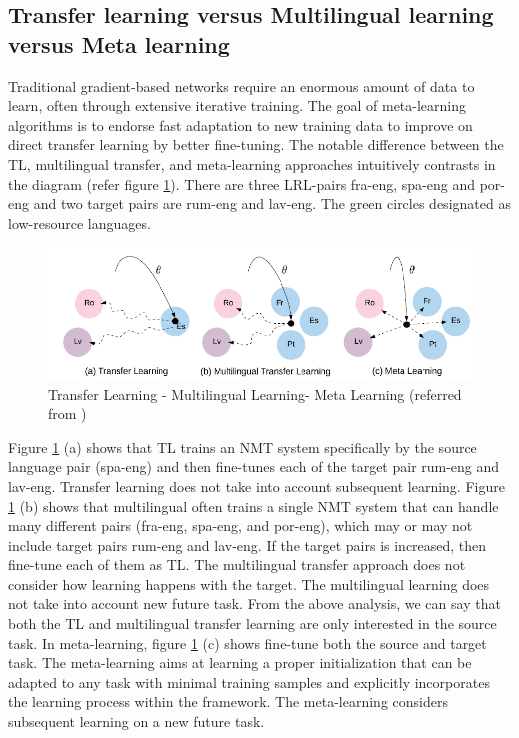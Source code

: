 \documentclass[manuscript,screen]{acmart}
\begin{document}
\subsection{Transfer learning versus Multilingual learning versus Meta learning}
Traditional gradient-based networks require an enormous amount of data to learn, often through extensive iterative training. The goal of meta-learning algorithms is to endorse fast adaptation to new training data to improve on direct transfer learning by better fine-tuning. The notable difference between the TL, multilingual transfer, and meta-learning approaches intuitively contrasts in the diagram (refer figure \ref{TL-MultiL-MetaL}). There are three LRL-pairs fra-eng, spa-eng and por-eng and two target pairs are rum-eng and lav-eng. The green circles designated as low-resource languages.

\begin{figure}[!h]
  \centering
  \includegraphics[width=\linewidth]{TLMuLLMeL.png}
  \caption{Transfer Learning - Multilingual Learning- Meta Learning (referred from \citet{gu2018meta})}
  \label{TL-MultiL-MetaL}
\end{figure}

Figure \ref{TL-MultiL-MetaL} (a) shows that TL trains an NMT system specifically by the source language pair (spa-eng) and then fine-tunes each of the target pair rum-eng and lav-eng. Transfer learning does not take into account subsequent learning.
Figure \ref{TL-MultiL-MetaL} (b) shows that multilingual often trains a single NMT system that can handle many different pairs (fra-eng, spa-eng, and por-eng), which may or may not include target pairs rum-eng and lav-eng. If the target pairs is increased, then fine-tune each of them as TL. The multilingual transfer approach does not consider how learning happens with the target. The multilingual learning does not take into account new future task. From the above analysis, we can say that both the TL and multilingual transfer learning are only interested in the source task. In meta-learning, figure \ref{TL-MultiL-MetaL} (c) shows fine-tune both the source and target task. The meta-learning aims at learning a proper initialization that can be adapted to any task with minimal training samples and explicitly incorporates the learning process within the framework. The meta-learning considers subsequent learning on a new future task.
\end{document}
